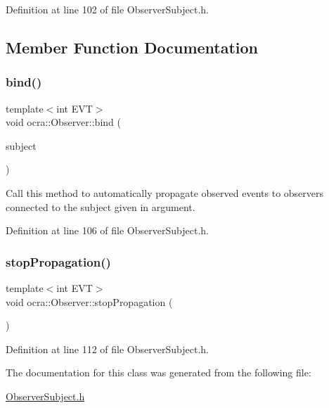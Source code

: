 Definition at line 102 of file Observer\+Subject.\+h.



\subsection{Member Function Documentation}
\hypertarget{classocra_1_1Observer_ab75bb7215b9e8af0e87420e29dd42c37}{}\label{classocra_1_1Observer_ab75bb7215b9e8af0e87420e29dd42c37} 
\subsubsection{\texorpdfstring{bind()}{bind()}}
{\footnotesize\ttfamily template$<$int E\+VT$>$ \\
void ocra\+::\+Observer\+::bind (\begin{DoxyParamCaption}\item[{\hyperlink{classocra_1_1SubjectBase}{Subject\+Base}$<$ E\+VT $>$ \&}]{subject }\end{DoxyParamCaption})\hspace{0.3cm}{\ttfamily [inline]}}



Call this method to automatically propagate observed events to observers connected to the subject given in argument. 



Definition at line 106 of file Observer\+Subject.\+h.

\hypertarget{classocra_1_1Observer_aa553cb069d393b84ec769f9f6367e1e3}{}\label{classocra_1_1Observer_aa553cb069d393b84ec769f9f6367e1e3} 
\subsubsection{\texorpdfstring{stop\+Propagation()}{stopPropagation()}}
{\footnotesize\ttfamily template$<$int E\+VT$>$ \\
void ocra\+::\+Observer\+::stop\+Propagation (\begin{DoxyParamCaption}{ }\end{DoxyParamCaption})\hspace{0.3cm}{\ttfamily [inline]}}



Definition at line 112 of file Observer\+Subject.\+h.



The documentation for this class was generated from the following file\+:\begin{DoxyCompactItemize}
\item 
\hyperlink{ObserverSubject_8h}{Observer\+Subject.\+h}\end{DoxyCompactItemize}
